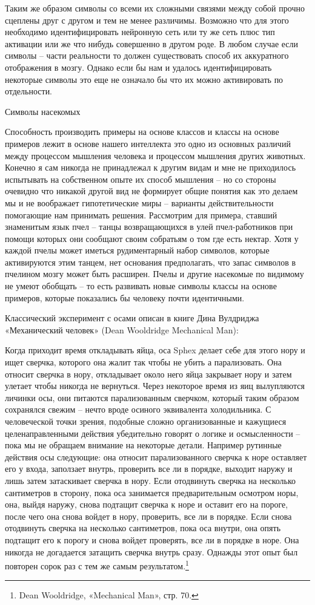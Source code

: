 \documentclass[../main.tex]{subfiles}
\begin{document}
Таким же образом символы со всеми их сложными связями между собой прочно сцеплены друг с другом и тем не менее различимы. Возможно что для этого необходимо идентифицировать нейронную сеть или ту же сеть плюс тип активации или же что нибудь совершенно в другом роде. В любом случае если символы \--- части реальности то должен существовать способ их аккуратного отображения в мозгу. Однако если бы нам и удалось идентифицировать некоторые символы это еще не означало бы что их можно активировать по отдельности.

Символы насекомых

Способность производить примеры на основе классов и классы на основе примеров лежит в основе нашего интеллекта это одно из основных различий между процессом мышления человека и процессом мышления других животных. Конечно я сам никогда не принадлежал к другим видам и мне не приходилось испытывать на собственном опыте их способ мышления \--- но со стороны очевидно что никакой другой вид не формирует общие понятия как это делаем мы и не воображает гипотетические миры \--- варианты действительности помогающие нам принимать решения. Рассмотрим для примера, ставший знаменитым язык пчел \--- танцы возвращающихся в улей пчел-работников при помощи которых они сообщают своим собратьям о том где есть нектар. Хотя у каждой пчелы может иметься рудиментарный набор символов, которые активируются этим танцем, нет основания предполагать, что запас символов в пчелином мозгу может быть расширен. Пчелы и другие насекомые по видимому не умеют обобщать \--- то есть развивать новые символы классы на основе примеров, которые показались бы человеку почти идентичными.

Классический эксперимент с осами описан в книге Дина Вулдриджа «Механический человек» (Dean Wooldridge Mechanical Man):

Когда приходит время откладывать яйца, оса Sphex делает себе для этого нору и ищет сверчка, которого она жалит так чтобы не убить а парализовать. Она относит сверчка в нору, откладывает около него яйца закрывает нору и затем улетает чтобы никогда не вернуться. Через некоторое время из яиц вылупляются личинки осы, они питаются парализованным сверчком, который таким образом сохранялся свежим \--- нечто вроде осиного эквивалента холодильника. С человеческой точки зрения, подобные сложно организованные и кажущиеся целенаправленными действия убедительно говорят о логике и осмысленности \--- пока мы не обращаем внимание на некоторые детали. Например рутинные действия осы следующие: она относит парализованного сверчка к норе оставляет его у входа, заползает внутрь, проверить все ли в порядке, выходит наружу и лишь затем затаскивает сверчка в нору. Если отодвинуть сверчка на несколько сантиметров в сторону, пока оса занимается предварительным осмотром норы, она, выйдя наружу, снова подтащит сверчка к норе и оставит его на пороге, после чего она снова войдет в нору, проверить, все ли в порядке. Если снова отодвинуть сверчка на несколько сантиметров, пока оса внутри, она опять подтащит его к порогу и снова войдет проверять, все ли в порядке в норе. Она никогда не догадается затащить сверчка внутрь сразу. Однажды этот опыт был повторен сорок раз с тем же самым результатом.\footnote{Dean Wooldridge, «Mechanical Man», стр. 70.}
\end{document}

